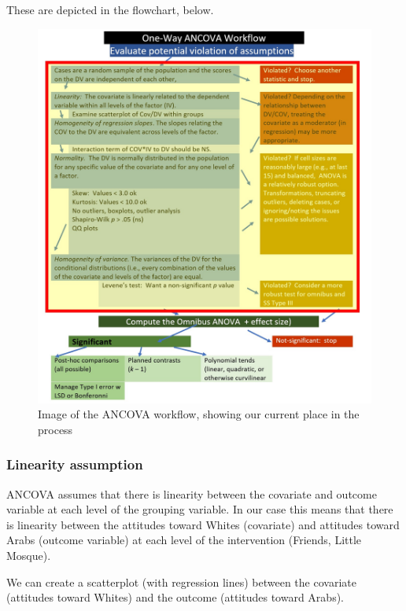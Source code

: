 \documentclass[
  11pt,
]{book}
\begin{document}
These are depicted in the flowchart, below.

\begin{figure}
\centering
\includegraphics{images/ANCOVA/wf_ANCOVA_assumptions.jpg}
\caption{Image of the ANCOVA workflow, showing our current place in the process}
\end{figure}

\hypertarget{linearity-assumption-1}{%
\subsubsection{Linearity assumption}\label{linearity-assumption-1}}

ANCOVA assumes that there is linearity between the covariate and outcome variable at each level of the grouping variable. In our case this means that there is linearity between the attitudes toward Whites (covariate) and attitudes toward Arabs (outcome variable) at each level of the intervention (Friends, Little Mosque).

We can create a scatterplot (with regression lines) between the covariate (attitudes toward Whites) and the outcome (attitudes toward Arabs).
\end{document}
